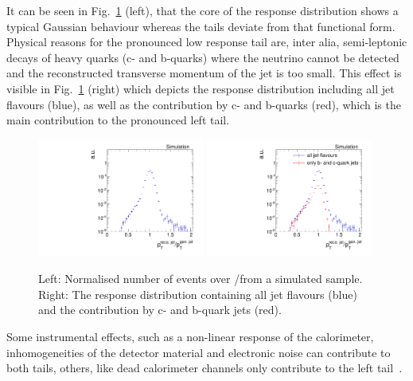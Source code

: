 It can be seen in Fig.~\ref{res:fig:TypicalResponse} (left), that the core of the response distribution shows a typical Gaussian behaviour whereas the tails deviate from that functional form.
Physical reasons for the pronounced low response tail are, inter alia, semi-leptonic decays of heavy quarks (c- and b-quarks) where the neutrino cannot be detected and the reconstructed transverse momentum of the jet is too small.
This effect is visible in Fig.~\ref{res:fig:TypicalResponse} (right) which depicts the response distribution including all jet flavours (blue), as well as the contribution by c- and b-quarks (red), which is the main contribution to the pronounced left tail.
\begin{figure}[!b]
  \centering
      \includegraphics[width=0.49\textwidth]{figures/resolution/generalApproach/ExampleResponse.pdf}
      \includegraphics[width=0.49\textwidth]{figures/resolution/generalApproach/intrinsicExampleContributionofBCQuarks.pdf}
  \caption{Left:  Normalised number of events over \ptrecojet/\ptgenjet from a simulated \GAMJET sample. 
           Right: The response distribution containing all jet flavours (blue) and the contribution by c- and b-quark jets (red). }  
  \label{res:fig:TypicalResponse}
\end{figure}
Some instrumental effects, such as a non-linear response of the calorimeter, inhomogeneities of the detector material and electronic noise can contribute to both tails, 
others, like dead calorimeter channels only contribute to the left tail~\cite{bib:Matthias_Thesis}. 



